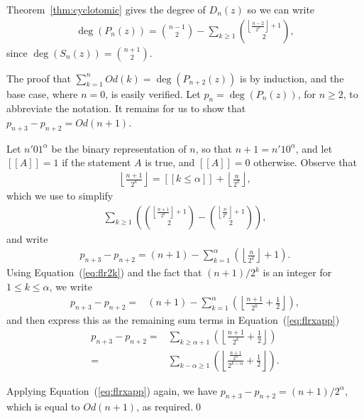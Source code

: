 \documentclass[12pt]{amsart}
\newcommand{\eref}[1]{Equation~(\ref{eq:#1})}
\newcommand{\tref}[1]{Theorem~\ref{thm:#1}}
\newcommand\flr[2]{\left\lfloor \frac{#1}{#2} \right\rfloor}
\newcommand{\round}[2]{\left\lfloor
    \frac{#1}{#2} + \frac{1}{2} \right\rfloor}
\newcommand{\op}{Od}
\newcommand{\I}[1]{{[\![#1]\!]}}            %
\begin{document}
\proof   %
\tref{cyclotomic} gives the degree of $D_n(z)$ so we can write
\begin{align}
  \label{eq:degp}
  \deg(P_n(z)) = \binom{n-1}{2} - \sum_{k\ge 1}
  \binom{\flr{n-2}{2^k}+1}{2},
\end{align}
since $\deg(S_n(z)) = \binom{n+1}{2}$.

The proof that $\sum_{k=1}^{n} \op(k) = \deg(P_{n+2}(z))$ is by induction, and the
base case, where $n=0$, is easily verified.  Let $p_{n} =
\deg(P_{n}(z))$, for $n\ge 2$, to abbreviate the notation.  It remains
for us to show that $p_{n+3} - p_{n+2} = \op(n+1)$.

Let $n'01^\alpha$ be the binary representation of $n$, so that $n+1 =
n'10^\alpha$, and let $\I{A}=1$ if the statement $A$ is true, and
$\I{A}=0$ otherwise.
%
Observe that
\begin{align}
  \label{eq:flr2k}
  \flr{n+1}{2^k} = \I{k\le \alpha} + \flr{n}{2^k},
\end{align}
 which we use to simplify
\begin{align*}
  \sum_{k \ge 1} \left(\binom{\flr{n+1}{2^k}+1}{2} -
    \binom{\flr{n}{2^k}+1}{2} \right),
\end{align*}
and write
\begin{align*}
  p_{n+3} - p_{n+2} =  (n+1) - \sum_{k=1}^{\alpha}\left( \flr{n}{2^k} +1 \right).
\end{align*}
Using \eref{flr2k} and the fact that $(n+1)/2^k$ is an integer for $1\le
k\le \alpha$, we write
\begin{align*}
  p_{n+3} - p_{n+2} =& (n+1) - \sum_{k=1}^{\alpha}\left( \round{n+1}{2^k} \right),
\end{align*}
and then express this as the remaining sum terms in \eref{flrxapp}
\begin{align*}
  p_{n+3} - p_{n+2} =& \sum_{k\ge \alpha + 1} \left(  \round{n+1}{2^k} \right)\\
  =& \sum_{k-\alpha \ge 1} \left( \left\lfloor
      \frac{\frac{n+1}{2^\alpha}}{2^{k-\alpha}}+ \frac{1}{2} \right\rfloor \right).
\end{align*}

Applying \eref{flrxapp} again, we have $ p_{n+3} - p_{n+2} =
(n+1)/2^\alpha$, which is equal to $\op(n+1)$, as required.\qed
\end{document}
